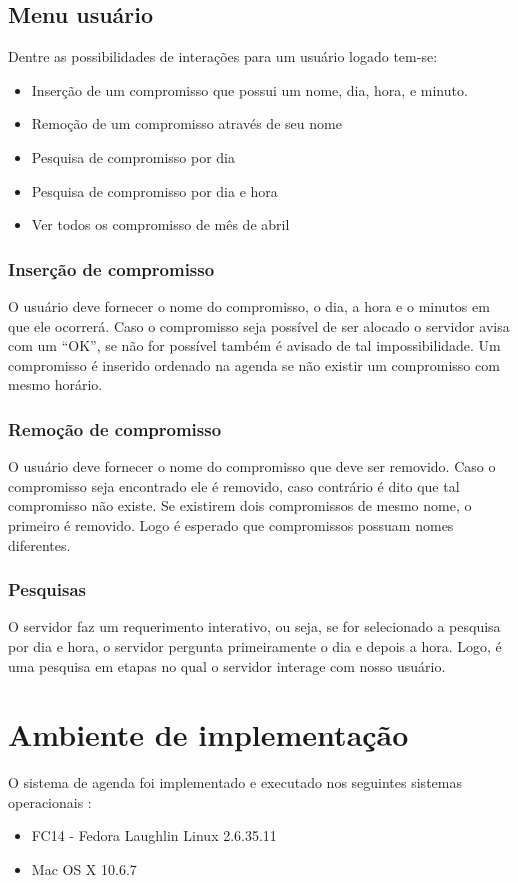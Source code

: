 \documentclass[10pt,a4paper]{article}
\begin{document}
\subsection{Menu usuário}
Dentre as possibilidades de interações para um usuário logado tem-se:

\begin{itemize}
\item Inserção de um compromisso que possui um nome, dia, hora, e minuto. 
\item Remoção de um compromisso através de seu nome
\item Pesquisa de compromisso por dia
\item Pesquisa de compromisso por dia e hora
\item Ver todos os compromisso de mês de abril
\end{itemize}

\subsubsection{Inserção de compromisso}
O usuário deve fornecer o nome do compromisso, o dia, a hora e o
minutos em que ele ocorrerá.
Caso o compromisso seja possível de ser alocado o servidor avisa com
um ``OK'', se não for possível também é avisado de tal impossibilidade.
Um compromisso é inserido ordenado na agenda se não existir um
compromisso com mesmo horário.

\subsubsection{Remoção de compromisso}
O usuário deve fornecer o nome do compromisso que deve ser removido.
Caso o compromisso seja encontrado ele é removido, caso contrário é
dito que tal compromisso não existe.
Se existirem dois compromissos de mesmo nome, o primeiro é removido.
Logo é esperado que compromissos possuam nomes diferentes.


\subsubsection{Pesquisas}
O servidor faz um requerimento interativo, ou seja, se for selecionado
a pesquisa por dia e hora, o servidor pergunta primeiramente o dia e
depois a hora. Logo, é uma pesquisa em etapas no qual o servidor
interage com nosso usuário.

\section{Ambiente de implementação}
O sistema de agenda foi implementado e executado nos seguintes sistemas operacionais :
\begin{itemize}
\item FC14 - Fedora Laughlin Linux 2.6.35.11
\item Mac OS X 10.6.7
\end{itemize}
\end{document}
